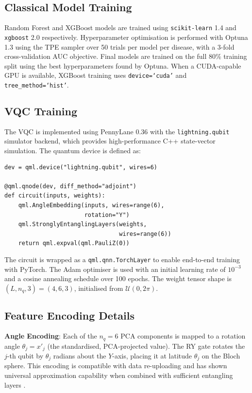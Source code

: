 ﻿\documentclass[conference]{IEEEtran}
\begin{document}
\subsection{Classical Model Training}

Random Forest and XGBoost models are trained using \texttt{scikit-learn} 1.4 and
\texttt{xgboost} 2.0 respectively. Hyperparameter optimisation is performed with Optuna
1.3 using the TPE sampler over 50 trials per model per disease, with a 3-fold
cross-validation AUC objective. Final models are trained on the full 80\% training split
using the best hyperparameters found by Optuna. When a CUDA-capable GPU is available,
XGBoost training uses \texttt{device=`cuda'} and \texttt{tree\_method=`hist'}.

\subsection{VQC Training}

The VQC is implemented using PennyLane 0.36 with the \texttt{lightning.qubit} simulator
backend, which provides high-performance C++ state-vector simulation. The quantum device
is defined as:

\begin{verbatim}
dev = qml.device("lightning.qubit", wires=6)

@qml.qnode(dev, diff_method="adjoint")
def circuit(inputs, weights):
    qml.AngleEmbedding(inputs, wires=range(6),
                       rotation="Y")
    qml.StronglyEntanglingLayers(weights,
                                 wires=range(6))
    return qml.expval(qml.PauliZ(0))
\end{verbatim}

The circuit is wrapped as a \texttt{qml.qnn.TorchLayer} to enable end-to-end training
with PyTorch. The Adam optimiser is used with an initial learning rate of $10^{-3}$ and
a cosine annealing schedule over 100 epochs. The weight tensor shape is
$(L, n_q, 3) = (4, 6, 3)$, initialised from $\mathcal{U}(0, 2\pi)$.

\subsection{Feature Encoding Details}

\textbf{Angle Encoding}: Each of the $n_q = 6$ PCA components is mapped to a rotation
angle $\theta_j = x'_j$ (the standardised, PCA-projected value). The RY gate rotates the
$j$-th qubit by $\theta_j$ radians about the $Y$-axis, placing it at latitude $\theta_j$
on the Bloch sphere. This encoding is compatible with data re-uploading and has shown
universal approximation capability when combined with sufficient entangling layers
\cite{perez2020data}.
\end{document}

